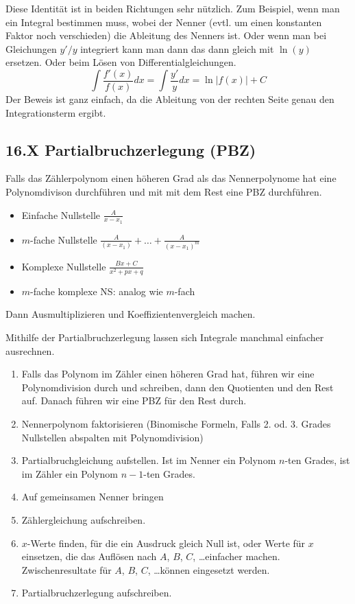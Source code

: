 \documentclass[a4paper,landscape,8pt]{extarticle}
\newcommand{\abs}[1]{\left\lvert #1 \right\rvert}
\begin{document}
\begin{multicols*}{4}
Diese Identität ist in beiden Richtungen sehr nützlich. Zum Beispiel, wenn man
ein Integral bestimmen muss, wobei der Nenner (evtl. um einen konstanten Faktor
noch verschieden) die Ableitung des Nenners ist. Oder wenn man bei Gleichungen
$y'/y$ integriert kann man dann das dann gleich mit $\ln(y)$ ersetzen. Oder beim
Lösen von Differentialgleichungen.
\[
\int \frac{f'(x)}{f(x)} dx = \int \frac{y'}{y} dx = \ln \abs{f(x)} + C
\]
Der Beweis ist ganz einfach, da die Ableitung von der rechten Seite genau den
Integrationsterm ergibt.

\subsection{16.X Partialbruchzerlegung (PBZ)}

Falls das Zählerpolynom einen höheren Grad als das Nennerpolynome hat eine
Polynomdivison durchführen und mit mit dem Rest eine PBZ durchführen.

\begin{itemize}
  \item Einfache Nullstelle $\frac{A}{x-x_1}$
  \item $m$-fache Nullstelle $\frac{A}{(x-x_1)}+\ldots+\frac{A}{(x-x_1)^m}$
  \item Komplexe Nullstelle $\frac{Bx+C}{x^2+px+q}$
  \item $m$-fache komplexe NS: analog wie $m$-fach
\end{itemize}

Dann Ausmultiplizieren und Koeffizientenvergleich machen.

\begin{warmup}
Mithilfe der Partialbruchzerlegung lassen sich Integrale manchmal einfacher
ausrechnen.

\Vorgehen

\begin{enumerate}
  \item Falls das Polynom im Zähler einen höheren Grad hat, führen wir eine
  Polynomdivision durch und schreiben, dann den Quotienten und den Rest auf.
  Danach führen wir eine PBZ für den Rest durch.
  \item Nennerpolynom faktorisieren (Binomische Formeln, Falls 2. od. 3. Grades
  Nullstellen abspalten mit Polynomdivision)
  \item Partialbruchgleichung aufstellen. Ist im Nenner ein Polynom $n$-ten
  Grades, ist im Zähler ein Polynom $n-1$-ten Grades.
  \item Auf gemeinsamen Nenner bringen
  \item Zählergleichung aufschreiben.
  \item $x$-Werte finden, für die ein Ausdruck gleich Null ist, oder Werte
  für $x$ einsetzen, die das Auflösen nach $A$, $B$, $C$, \ldots einfacher
  machen. Zwischenresultate für $A$, $B$, $C$, \ldots können eingesetzt werden.
  \item Partialbruchzerlegung aufschreiben.
\end{enumerate}


\end{warmup}
\end{multicols*}
\end{document}
